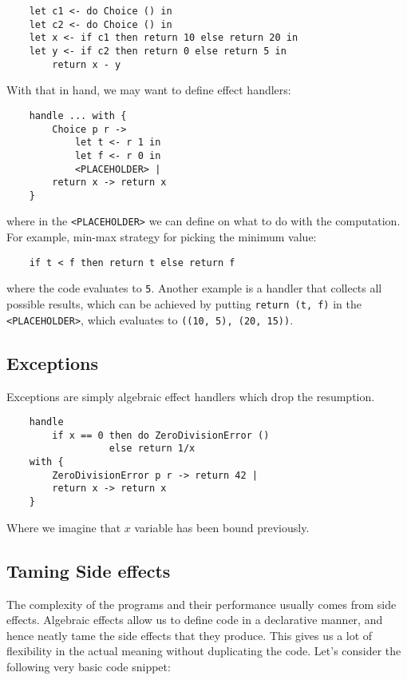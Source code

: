 \documentclass[declaration,shortabstract]{iithesis}
\theoremstyle{definition} \newtheorem{definition}{Definition}[chapter]
\theoremstyle{remark} \newtheorem{remark}[definition]{Observation}
\theoremstyle{plain} \newtheorem{theorem}[definition]{Theorem}
\theoremstyle{plain} \newtheorem{lemma}[definition]{Lemma}
\begin{document}
    \begin{verbatim}
    let c1 <- do Choice () in
    let c2 <- do Choice () in
    let x <- if c1 then return 10 else return 20 in
    let y <- if c2 then return 0 else return 5 in
        return x - y
    \end{verbatim}
    With that in hand, we may want to define effect handlers:

    \begin{verbatim}
    handle ... with {
        Choice p r ->
            let t <- r 1 in
            let f <- r 0 in
            <PLACEHOLDER> |
        return x -> return x
    }
    \end{verbatim}
    where in the \verb!<PLACEHOLDER>! we can define on what to do with the
    computation. For example, min-max strategy for picking the minimum value:

    \begin{verbatim}
    if t < f then return t else return f
    \end{verbatim}
    where the code evaluates to \verb!5!. Another example is a handler that
    collects all possible results, which can be achieved by putting
    \verb!return (t, f)! in the \verb!<PLACEHOLDER>!, which evaluates to
    \verb!((10, 5), (20, 15))!.

    \subsection{Exceptions}

    Exceptions are simply algebraic effect handlers which drop the resumption.

    \begin{verbatim}
    handle
        if x == 0 then do ZeroDivisionError ()
                  else return 1/x
    with {
        ZeroDivisionError p r -> return 42 |
        return x -> return x
    }
    \end{verbatim}
    Where we imagine that $x$ variable has been bound previously.

    \subsection{Taming Side effects}

    The complexity of the programs and their performance usually comes from side effects.
    Algebraic effects allow us to define code in a declarative manner, and hence
    neatly tame the side effects that they produce. This gives us a lot of flexibility
    in the actual meaning without duplicating the code. Let's consider the following
    very basic code snippet:
\end{document}
